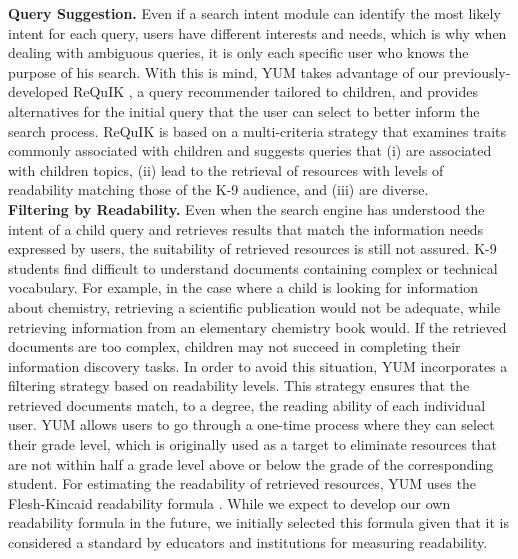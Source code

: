 \documentclass{sig-alternate-05-2015}
\begin{document}
\noindent
\textbf{Query Suggestion.} Even if a search intent module can identify the most likely intent for each query, users have different interests and needs, which is why when dealing with ambiguous queries, it is only each specific user who knows the purpose of his search. With this is mind,  YUM takes advantage of our previously-developed ReQuIK \cite{Requik}, a query recommender tailored to children, and provides alternatives for the initial query that the user can select to better inform the search process. ReQuIK is based on a multi-criteria strategy that examines  traits commonly associated with children and suggests queries that (i) are associated with children topics, (ii) lead to the retrieval of resources with levels of readability matching those of the K-9 audience, and (iii) are diverse.\\

\noindent
\textbf{Filtering by Readability.} Even when the search engine has understood the intent of a child query and retrieves results that match the information needs expressed by users, the suitability of retrieved resources is still not assured.  K-9 students find difficult to understand documents containing complex or technical vocabulary. For example, in the case where a child is looking for information about chemistry, retrieving a scientific publication would not be adequate, while retrieving information from an elementary chemistry book would. If the retrieved documents are too complex, children may not succeed in completing their information discovery tasks. In order to avoid this situation, YUM incorporates a filtering strategy based on readability levels. This strategy ensures that the retrieved documents match, to a degree, the reading ability of each individual user. YUM allows users to go through a one-time process where they can select their grade level, which is originally used as a target to eliminate resources that are not within half a grade level above or below the grade of the corresponding student. For estimating the readability of retrieved resources, YUM uses the Flesh-Kincaid readability formula \cite{Fle48}. While we expect to develop our own readability formula in the future, we initially selected this formula given that it is considered a standard by educators and institutions for measuring readability.  
\\
\end{document}
